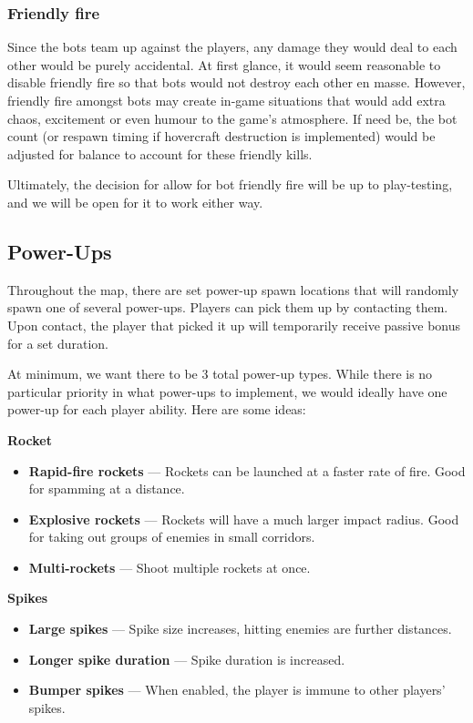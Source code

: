 \documentclass{article}
\theoremstyle{definition}
\begin{document}
\subsubsection{Friendly fire}

Since the bots team up against the players, any damage they would deal to each
other would be purely accidental. At first glance, it would seem reasonable to
disable friendly fire so that bots would not destroy each other en masse.
However, friendly fire amongst bots may create in-game situations that would
add extra chaos, excitement or even humour to the game's atmosphere. If need
be, the bot count (or respawn timing if hovercraft destruction is implemented)
would be adjusted for balance to account for these friendly kills.

Ultimately, the decision for allow for bot friendly fire will be up to
play-testing, and we will be open for it to work either way.

\subsection{Power-Ups}

Throughout the map, there are set power-up spawn locations that will randomly
spawn one of several power-ups. Players can pick them up by contacting them.
Upon contact, the player that picked it up will temporarily receive passive
bonus for a set duration.

At minimum, we want there to be 3 total power-up types. While there is no
particular priority in what power-ups to implement, we would ideally have one
power-up for each player ability. Here are some ideas:

\textbf{Rocket}
\begin{itemize}
  \item \textbf{Rapid-fire rockets} --- Rockets can be launched at a faster rate of
    fire. Good for spamming at a distance.
  \item \textbf{Explosive rockets} --- Rockets will have a much larger impact
    radius. Good for taking out groups of enemies in small corridors.
  \item \textbf{Multi-rockets} --- Shoot multiple rockets at once.
\end{itemize}

\textbf{Spikes}
\begin{itemize}
  \item \textbf{Large spikes} --- Spike size increases, hitting enemies are
    further distances.
  \item \textbf{Longer spike duration} --- Spike duration is increased.
  \item \textbf{Bumper spikes} --- When enabled, the player is immune to other
    players' spikes.
\end{itemize}
\end{document}
